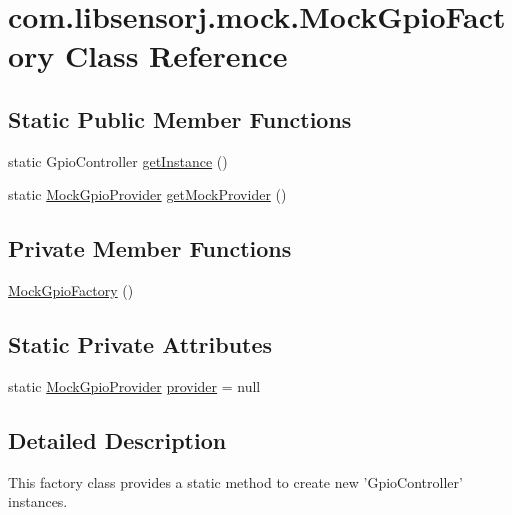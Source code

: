 \hypertarget{classcom_1_1libsensorj_1_1mock_1_1MockGpioFactory}{}\section{com.\+libsensorj.\+mock.\+Mock\+Gpio\+Factory Class Reference}
\label{classcom_1_1libsensorj_1_1mock_1_1MockGpioFactory}
\subsection*{Static Public Member Functions}
\begin{DoxyCompactItemize}
\item 
static Gpio\+Controller \hyperlink{classcom_1_1libsensorj_1_1mock_1_1MockGpioFactory_a58463148954717dc22f75886523d4771}{get\+Instance} ()
\item 
static \hyperlink{classcom_1_1libsensorj_1_1mock_1_1MockGpioProvider}{Mock\+Gpio\+Provider} \hyperlink{classcom_1_1libsensorj_1_1mock_1_1MockGpioFactory_adbc2afeac5d0b886eef76f1984f0c382}{get\+Mock\+Provider} ()
\end{DoxyCompactItemize}
\subsection*{Private Member Functions}
\begin{DoxyCompactItemize}
\item 
\hyperlink{classcom_1_1libsensorj_1_1mock_1_1MockGpioFactory_ad4fb10cfe04911a6104bbb1e0b3a3252}{Mock\+Gpio\+Factory} ()
\end{DoxyCompactItemize}
\subsection*{Static Private Attributes}
\begin{DoxyCompactItemize}
\item 
static \hyperlink{classcom_1_1libsensorj_1_1mock_1_1MockGpioProvider}{Mock\+Gpio\+Provider} \hyperlink{classcom_1_1libsensorj_1_1mock_1_1MockGpioFactory_aa7cf0e5787b3ffe138f0cea0668df93e}{provider} = null
\end{DoxyCompactItemize}


\subsection{Detailed Description}
This factory class provides a static method to create new 'Gpio\+Controller' instances. 

